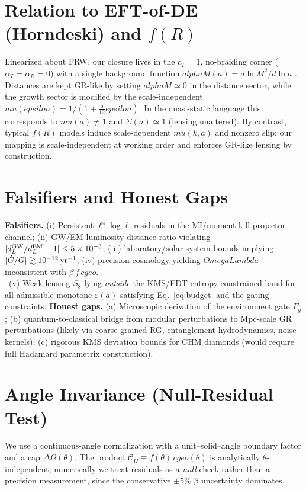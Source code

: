 \documentclass[aps,prd,onecolumn,superscriptaddress,nofootinbib]{revtex4-2}
\def\OmL{OmegaLambda}%
\def\cgeo{cgeo}%
\def\alphaM{alphaM}%
\def\eps{epsilon}%
\def\mu{mu}%
\def\alpha{alpha}%
\def\alpha_M{alphaM}%
\def\Omega_\Lambda{OmegaLambda}%
\providecommand{\OmL}{\Omega_\Lambda}
\providecommand{\cgeo}{c_{\rm geo}}
\providecommand{\alphaM}{\alpha_M}
\providecommand{\eps}{\varepsilon}
\begin{document}
\section{Relation to EFT-of-DE (Horndeski) and \texorpdfstring{$f(R)$}{f(R)}}
\label{sec:eft}
Linearized about FRW, our closure lives in the \(c_T=1\), no-braiding corner (\(\alpha_T=\alpha_B=0\)) with a single background function \(\alphaM(a)=d\ln M^2/d\ln a\) \cite{BelliniSawicki2014}. Distances are kept GR-like by setting \(\alphaM\simeq 0\) in the distance sector, while the growth sector is modified by the scale-independent \(\mu(\eps)=1/(1+\tfrac{5}{12}\eps)\). In the quasi-static language this corresponds to \(\mu(a)\neq 1\) and \(\Sigma(a)\simeq 1\) (lensing unaltered). By contrast, typical \(f(R)\) models induce scale-dependent \(\mu(k,a)\) and nonzero slip; our mapping is scale-independent at working order and enforces GR-like lensing by construction.

\section{Falsifiers and Honest Gaps}
\label{sec:falsifiers}
\textbf{Falsifiers.} (i) Persistent \(\ell^4\log\ell\) residuals in the MI/moment-kill projector channel; (ii) GW/EM luminosity-distance ratio violating \(|d_L^{\rm GW}/d_L^{\rm EM}-1|\le 5\times 10^{-3}\); (iii) laboratory/solar-system bounds implying \(|\dot G/G|\gtrsim 10^{-12}\,{\rm yr}^{-1}\); (iv) precision cosmology yielding \(\OmL\) inconsistent with \(\beta\,f\,\cgeo\).\\
\ (v) Weak-lensing \(S_8\) lying \emph{outside} the KMS/FDT entropy-constrained band for all admissible monotone \(\varepsilon(a)\) satisfying Eq.~\eqref{eq:budget} and the gating constraints.
\textbf{Honest gaps.} (a) Microscopic derivation of the environment gate \(F_g\); (b) quantum-to-classical bridge from modular perturbations to Mpc-scale GR perturbations (likely via coarse-grained RG, entanglement hydrodynamics, noise kernels); (c) rigorous KMS deviation bounds for CHM diamonds (would require full Hadamard parametrix construction).

\section{Angle Invariance (Null-Residual Test)}
\label{sec:theta}
We use a continuous-angle normalization with a unit--solid--angle boundary factor and a cap \(\Delta\Omega(\theta)\). The product \(\mathcal C_\Omega\equiv f(\theta)\, \cgeo(\theta)\) is analytically \(\theta\)-independent; numerically we treat residuals as a \emph{null} check rather than a precision measurement, since the conservative \(\pm 5\%\) \(\beta\) uncertainty dominates.
\end{document}
